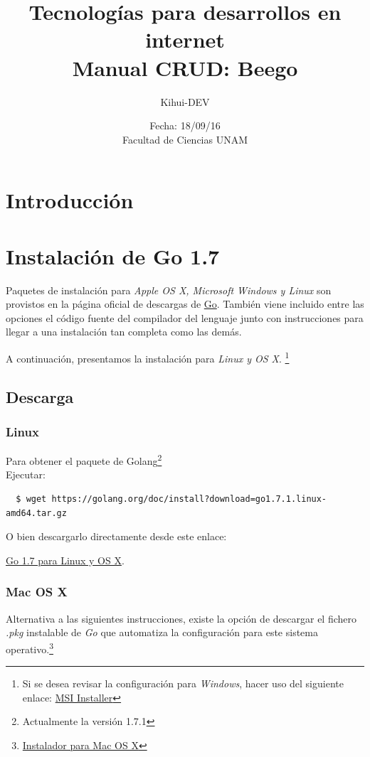 \documentclass[12pt]{article}
\title{Tecnologías para desarrollos en internet \\ Manual CRUD: Beego}
\author{Kihui-DEV}
\date{Fecha: 18/09/16 \\ Facultad de Ciencias UNAM}
\begin{document}
\maketitle
\tableofcontents{}
\newpage

\section{Introducción}
\section{Instalación de Go 1.7}
Paquetes de instalación para \textit{Apple OS X, Microsoft Windows y Linux} son provistos en la página oficial de descargas de \href{https://golang.org/dl/}{Go}. También viene incluido entre las opciones el código fuente del compilador del lenguaje junto con instrucciones para llegar a una instalación tan completa como las demás. \par
A continuación, presentamos la instalación para \textit{Linux y OS X}. \footnote{Si se desea revisar la configuración para \textit{Windows}, hacer uso del siguiente enlace:
  \href{https://golang.org/doc/install?download=go1.7.1.windows-amd64.msi}{MSI Installer}}

\subsection{Descarga}\label{sec:d}


\subsubsection*{Linux}
Para obtener el paquete de Golang\footnote{Actualmente la versión 1.7.1} \\
Ejecutar:
\begin{verbatim}
  $ wget https://golang.org/doc/install?download=go1.7.1.linux-amd64.tar.gz
\end{verbatim}
O bien descargarlo directamente desde este enlace:
\begin{center}
\href{https://golang.org/doc/install?download=go1.7.1.linux-amd64.tar.gz}{Go 1.7 para Linux y OS X}.
\end{center}


\subsubsection*{Mac OS X}
Alternativa a las siguientes instrucciones, existe la opción de descargar el fichero \textit{.pkg} instalable de \textit{Go} que automatiza la configuración para este sistema operativo.\footnote{\href{https://golang.org/doc/install?download=go1.7.1.darwin-amd64.pkg}{Instalador para Mac OS X}}\\[1mm]
\end{document}
